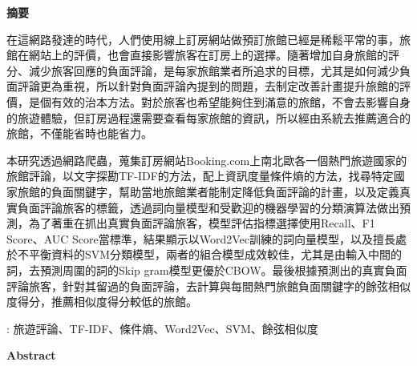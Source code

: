 \begin{center} 
{\Large \bf 摘要}\\[20pt]      
\end{center}

   	在這網路發達的時代，人們使用線上訂房網站做預訂旅館已經是稀鬆平常的事，旅館在網站上的評價，也會直接影響旅客在訂房上的選擇。隨著增加自身旅館的評分、減少旅客回應的負面評論，是每家旅館業者所追求的目標，尤其是如何減少負面評論更為重視，所以針對負面評論內提到的問題，去制定改善計畫提升旅館的評價，是個有效的治本方法。對於旅客也希望能夠住到滿意的旅館，不會去影響自身的旅遊體驗，但訂房過程還需要查看每家旅館的資訊，所以經由系統去推薦適合的旅館，不僅能省時也能省力。
   	
	本研究透過網路爬蟲，蒐集訂房網站Booking.com上南北歐各一個熱門旅遊國家的旅館評論，以文字探勘TF-IDF的方法，配上資訊度量條件熵的方法，找尋特定國家旅館的負面關鍵字，幫助當地旅館業者能制定降低負面評論的計畫，以及定義真實負面評論旅客的標籤，透過詞向量模型和受歡迎的機器學習的分類演算法做出預測，為了著重在抓出真實負面評論旅客，模型評估指標選擇使用Recall、F1 Score、AUC Score當標準，結果顯示以Word2Vec訓練的詞向量模型，以及擅長處於不平衡資料的SVM分類模型，兩者的組合模型成效較佳，尤其是由輸入中間的詞，去預測周圍的詞的Skip gram模型更優於CBOW。最後根據預測出的真實負面評論旅客，針對其留過的負面評論，去計算與每間熱門旅館負面關鍵字的餘弦相似度得分，推薦相似度得分較低的旅館。

\vspace*{1cm}
: 旅遊評論、TF-IDF、條件熵、Word2Vec、SVM、餘弦相似度

\newpage 
\cleardoublepage 
\setlength{\parindent}{2em} 
\thispagestyle{empty}  
\vspace*{1cm} 

\begin{center} 
{\Large \bf Abstract}\\[20pt]      
\end{center}
	

